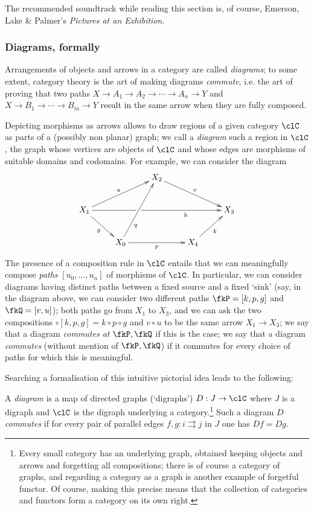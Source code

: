 \documentclass[11pt]{article}
\begin{document}
The recommended soundtrack while reading this section is, of course, Emerson, Lake \& Palmer's \emph{Pictures at an Exhibition}.

\subsubsection{Diagrams, formally}
Arrangements of objects and arrows in a category are called \emph{diagrams}; to some extent, category theory is the art of making diagrams \emph{commute}, i.e. the art of proving that two paths $X\to A_1\to A_2 \to\cdots\to A_n \to Y$ and $X \to B_1\to\cdots\to B_m \to Y$ result in the same arrow when they are fully composed.

\begin{remark}\leavevmode
	Depicting morphisms as arrows allows to draw regions of a given category $\clC$ as parts of a (possibly non planar) graph; we call a \emph{diagram} such a region in $\clC$, the graph whose vertices are objects of $\clC$ and whose edges are morphisms of suitable domains and codomains. For example, we can consider the diagram
	\[
		\vcenter{\xymatrix{
				&&X_2\ar[drr]^v&& \\
				X_1\ar[dr]_g\ar[urr]^u\ar[rrrr]|(.375)\hole_(.7)h&&&&X_3\\
				& X_0 \ar[uur]_(.3)q\ar[rr]_p&& X_4 \ar[ur]_k&
			}}
	\]
	The presence of a composition rule in $\clC$ entails that we can meaningfully compose \emph{paths} $[u_0,\dots, u_n]$ of morphisms of $\clC$. In particular, we can consider diagrams having distinct paths between a fixed source and a fixed `sink' (say, in the diagram above, we can consider two different paths $\fkP = [k,p,g]$ and $\fkQ = [v,u]$); both paths go from $X_1$ to $X_3$, and we can ask the two compositions $\circ[k,p,g] = k\circ p\circ g$ and $v\circ u$ to be the same arrow $X_1\to X_3$; we say that a diagram \emph{commutes at $\fkP,\fkQ$} if this is the case; we say that a diagram \emph{commutes} (without mention of $\fkP, \fkQ$) if it commutes for every choice of paths for which this is meaningful.
\end{remark}
Searching a formalisation of this intuitive pictorial idea leads to the following:
\begin{definition}
	A \emph{diagram} is a map of directed graphs (`digraphs') $D : J \to \clC$ where $J$ is a digraph and $\clC$ is the digraph underlying a category.\footnote{Every small category has an underlying graph, obtained keeping objects and arrows and forgetting all compositions; there is of course a category of graphs, and regarding a category as a graph is another example of forgetful functor. Of course, making this precise means that the collection of categories and functors form a category on its own right.} Such a diagram $D$ \emph{commutes} if for every pair of parallel edges $f,g : i\rightrightarrows j$ in $J$ one has $Df = Dg$.
\end{definition}
\end{document}
